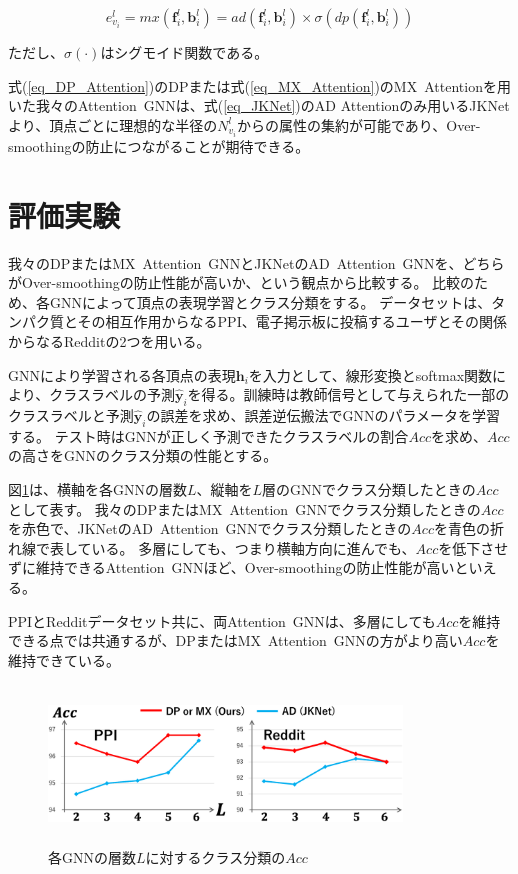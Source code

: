 \documentclass[a4j,twocolumn]{jsarticle}
\begin{document}
\vspace{-1mm}
\begin{equation}
  e_{v_i}^l = mx(\bm{f}_i^l, \bm{b}_i^l) = ad(\bm{f}_i^l, \bm{b}_i^l) \times \sigma(dp(\bm{f}_i^l, \bm{b}_i^l)) \label{eq_MX_Attention}
\end{equation}
\vspace{-5mm}

\noindent
ただし、$\sigma(\cdot)$はシグモイド関数である。

式(\ref{eq_DP_Attention})のDPまたは式(\ref{eq_MX_Attention})のMX~Attentionを用いた我々のAttention~GNNは、式(\ref{eq_JKNet})のAD Attentionのみ用いるJKNetより、頂点ごとに理想的な半径の$N_{v_i}^l$からの属性の集約が可能であり、Over-smoothingの防止につながることが期待できる。

\section{評価実験}
\label{sec_experiment}

\vspace{-2mm}
我々のDPまたはMX~Attention~GNNとJKNet\cite{Xu1}のAD~Attention~GNNを、どちらがOver-smoothingの防止性能が高いか、という観点から比較する。
比較のため、各GNNによって頂点の表現学習とクラス分類をする。
データセットは、タンパク質とその相互作用からなるPPI、電子掲示板に投稿するユーザとその関係からなるRedditの2つを用いる。

GNNにより学習される各頂点の表現$\bm{h}_i$を入力として、線形変換とsoftmax関数により、クラスラベルの予測$\bm{\hat{y}}_i$を得る。訓練時は教師信号として与えられた一部のクラスラベルと予測$\bm{\hat{y}}_i$の誤差を求め、誤差逆伝搬法でGNNのパラメータを学習する。
テスト時はGNNが正しく予測できたクラスラベルの割合$Acc$を求め、$Acc$の高さをGNNのクラス分類の性能とする。

図\ref{fig_accuracy}は、横軸を各GNNの層数$L$、縦軸を$L$層のGNNでクラス分類したときの$Acc$として表す。
我々のDPまたはMX~Attention~GNNでクラス分類したときの$Acc$を赤色で、JKNetのAD~Attention~GNNでクラス分類したときの$Acc$を青色の折れ線で表している。
多層にしても、つまり横軸方向に進んでも、$Acc$を低下させずに維持できるAttention~GNNほど、Over-smoothingの防止性能が高いといえる。

PPIとRedditデータセット共に、両Attention~GNNは、多層にしても$Acc$を維持できる点では共通するが、DPまたはMX~Attention~GNNの方がより高い$Acc$を維持できている。

\begin{figure}[b]
  \centering
  \includegraphics[height=4.2cm,width=9.4cm]{acc.eps}
  \vspace{-7mm}
  \caption{各GNNの層数$L$に対するクラス分類の$Acc$}
  \label{fig_accuracy}
\end{figure}
\end{document}
